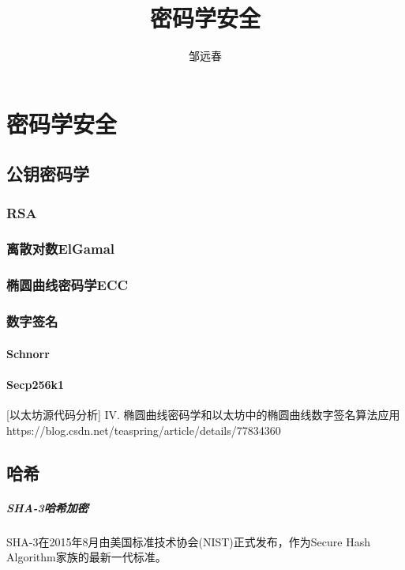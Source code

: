 \documentclass[UTF8]{ctexart}
\title{密码学安全}
\author{邹远春}
\date{}
\begin{document}
\maketitle
\else
\chapter{密码学安全}
\fi
\section{公钥密码学}

\subsection{RSA}

\subsection{离散对数ElGamal}

\subsection{椭圆曲线密码学ECC}

\subsection{数字签名}

\subsubsection{Schnorr}

\subsubsection{Secp256k1}

[以太坊源代码分析] IV. 椭圆曲线密码学和以太坊中的椭圆曲线数字签名算法应用
https://blog.csdn.net/teaspring/article/details/77834360

\section{哈希}

\paragraph{SHA-3哈希加密}
SHA-3在2015年8月由美国标准技术协会(NIST)正式发布，作为Secure Hash Algorithm家族的最新一代标准。
\end{document}
